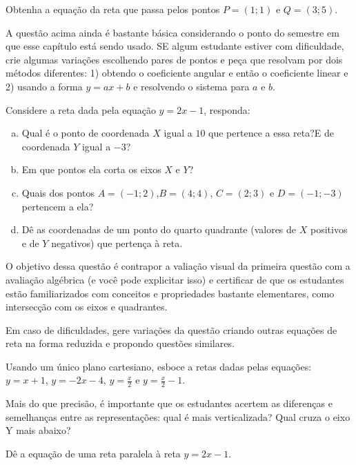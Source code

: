 \documentclass[main_estudante.tex]{subfiles}
\begin{document}
\begin{questao}
Obtenha a equação da reta que passa pelos pontos $P=(1;1)$ e $Q=(3;5)$.
\end{questao}

A questão acima ainda é bastante básica considerando o ponto do semestre em que esse capítulo está sendo usado. SE algum estudante estiver com dificuldade, crie algumas variações escolhendo pares de pontos e peça que resolvam por dois métodos diferentes: 1) obtendo o coeficiente angular e então o coeficiente linear e 2) usando a forma $y=ax+b$ e resolvendo o sistema para $a$ e $b$.

\begin{questao}
Considere a reta dada pela equação $y=2x-1$, responda:
\begin{enumerate}[a)]
\item Qual é o ponto de coordenada $X$ igual a $10$ que pertence a essa reta?E de coordenada $Y$ igual a $-3$?
\item Em que pontos ela corta os eixos $X$ e $Y$?
\item Quais dos pontos $A=(-1;2)$,$B=(4;4)$, $C=(2;3)$ e $D=(-1;-3)$ pertencem a ela? 
\item Dê as coordenadas de um ponto do quarto quadrante (valores de $X$ positivos e de $Y$ negativos) que pertença à reta.
\end{enumerate} 
\end{questao}

O objetivo dessa questão é contrapor a valiação visual da primeira questão com a avaliação algébrica (e você pode explicitar isso) e certificar de que os estudantes estão familiarizados com conceitos e propriedades bastante elementares, como intersecção com os eixos e quadrantes.

Em caso de dificuldades, gere variações da questão criando outras equações de reta na forma reduzida e propondo questões similares.

\begin{questao}
Usando um único plano cartesiano, esboce a retas dadas pelas equações: $y=x+1$, $y=-2x-4$, $y=\frac{x}{2}$ e $y=\frac{x}{2}-1$.
\end{questao}

Mais do que precisão, é importante que os estudantes acertem as diferenças e semelhanças entre as representações: qual é mais verticalizada? Qual cruza o eixo Y mais abaixo?

\begin{questao}
Dê a equação de uma reta paralela à reta $y=2x-1$.
\end{questao}
\end{document}
